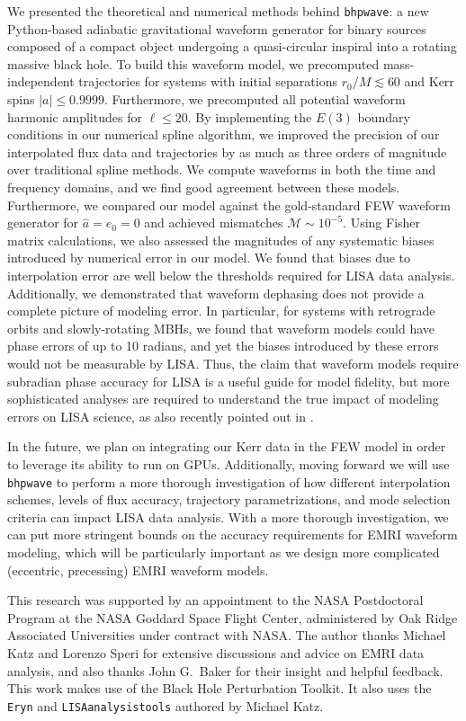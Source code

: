 \documentclass[%
 reprint,
 nofootinbib,
 amsmath,amssymb,
 aps,
 prd,
]{revtex4-2}
\begin{document}
We presented the theoretical and numerical methods behind \texttt{bhpwave}: a new Python-based adiabatic gravitational waveform generator for binary sources composed of a compact object undergoing a quasi-circular inspiral into a rotating massive black hole. To build this waveform model, we precomputed mass-independent trajectories for systems with initial separations $r_0/M \lesssim 60$ and Kerr spins $|a| \leq 0.9999$. Furthermore, we precomputed all potential waveform harmonic amplitudes for $\ell \leq 20$. By implementing the $E(3)$ boundary conditions in our numerical spline algorithm, we improved the precision of our interpolated flux data and trajectories by as much as three orders of magnitude over traditional spline methods. We compute waveforms in both the time and frequency domains, and we find good agreement between these models. Furthermore, we compared our model against the gold-standard FEW waveform generator for $\hat{a} = e_0 = 0$ and achieved mismatches $\mathcal{M} \sim 10^{-5}$. Using Fisher matrix calculations, we also assessed the magnitudes of any systematic biases introduced by numerical error in our model. We found that biases due to interpolation error are well below the thresholds required for LISA data analysis. Additionally, we demonstrated that waveform dephasing does not provide a complete picture of modeling error. In particular, for systems with retrograde orbits and slowly-rotating MBHs, we found that waveform models could have phase errors of up to 10 radians, and yet the biases introduced by these errors would not be measurable by LISA. Thus, the claim that waveform models require subradian phase accuracy for LISA is a useful guide for model fidelity, but more sophisticated analyses are required to understand the true impact of modeling errors on LISA science, as also recently pointed out in \cite{Burke}.

In the future, we plan on integrating our Kerr data in the FEW model in order to leverage its ability to run on GPUs. Additionally, moving forward we will use \texttt{bhpwave} to perform a more thorough investigation of how different interpolation schemes, levels of flux accuracy, trajectory parametrizations, and mode selection criteria can impact LISA data analysis. With a more thorough investigation, we can put more stringent bounds on the accuracy requirements for EMRI waveform modeling, which will be particularly important as we design more complicated (eccentric, precessing) EMRI waveform models.

\begin{acknowledgements}
This research was supported by an appointment to the NASA Postdoctoral Program at the NASA Goddard Space Flight Center, administered by Oak Ridge Associated Universities under contract with NASA. The author thanks Michael Katz and Lorenzo Speri for extensive discussions and advice on EMRI data analysis, and also thanks John G.~Baker for their insight and helpful feedback. This work makes use of the Black Hole Perturbation Toolkit. It also uses the \texttt{Eryn} and \texttt{LISAanalysistools} authored by Michael Katz.
\end{acknowledgements}
\end{document}
